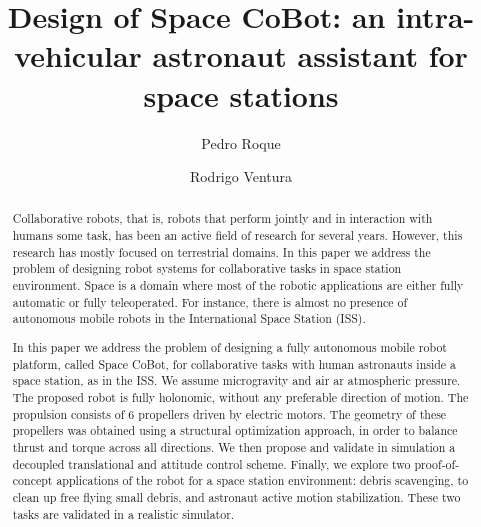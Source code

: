 \documentclass[review]{elsarticle}
\begin{document}
\begin{frontmatter}

\title{Design of Space CoBot: an intra-vehicular astronaut assistant for space stations}

\author{Pedro Roque}
\author[mycorrespondingauthor]{Rodrigo Ventura}
\address{Institute for Systems and Robotics \\
  Instituto Superior Técnico, Universidade de Lisboa \\
  Av. Rovisco Pais, 1, 1049-001 Lisboa, Portugal}




\begin{abstract}

  Collaborative robots, that is, robots that perform jointly and in interaction with humans some task, has been an active field of research for several years. However, this research has mostly focused on terrestrial domains. In this paper we address the problem of designing robot systems for collaborative tasks in space station environment. Space is a domain where most of the robotic applications are either fully automatic or fully teleoperated. For instance, there is almost no presence of autonomous mobile robots in the International Space Station (ISS).

  In this paper we address the problem of designing a fully autonomous mobile robot platform, called Space CoBot, for collaborative tasks with human astronauts inside a space station, as in the ISS. We assume microgravity and air ar atmospheric pressure. The proposed robot is fully holonomic, without any preferable direction of motion. The propulsion consists of 6 propellers driven by electric motors. The geometry of these propellers was obtained using a structural optimization approach, in order to balance thrust and torque across all directions. We then propose and validate in simulation a decoupled translational and attitude control scheme. Finally, we explore two proof-of-concept applications of the robot for a space station environment: debris scavenging, to clean up free flying small debris, and astronaut active motion stabilization. These two tasks are validated in a realistic simulator.


\end{abstract}
\end{frontmatter}
\end{document}
